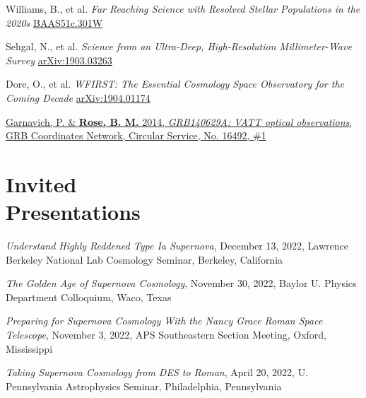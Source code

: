 \documentclass[margin]{res}
\begin{document}
\begin{resume}
\vspace{-12pt}\hspace{15pt}\hangindent=30pt 
Williams, B., et al. \textit{Far Reaching Science with Resolved Stellar Populations in the 2020s}
\href{https://ui.adsabs.harvard.edu/abs/2019BAAS...51c.301W/abstract}{BAAS51c.301W}

\vspace{-12pt}\hspace{15pt}\hangindent=30pt 
Sehgal, N., et al. \textit{Science from an Ultra-Deep, High-Resolution Millimeter-Wave Survey}
\href{https://ui.adsabs.harvard.edu/abs/2019arXiv190303263S/abstract}{arXiv:1903.03263}

\vspace{-12pt}\hspace{15pt}\hangindent=30pt 
Dore, O., et al. \textit{WFIRST: The Essential Cosmology Space Observatory for the Coming Decade}
\href{https://ui.adsabs.harvard.edu/abs/2019arXiv190401174D/abstract}{arXiv:1904.01174}

\vspace{-12pt}
\hangindent=15pt \href{https://ui.adsabs.harvard.edu/abs/2014GCN..16492...1G/abstract}{Garnavich, P. \& {\bf Rose, B. M.} 2014, {\sl GRB140629A: VATT optical observations}, GRB Coordinates Network, Circular Service, No. 16492, \#1}




\section{Invited \\Presentations}

\hangindent=15pt 
\textit{Understand Highly Reddened Type Ia Supernova}, December 13, 2022, Lawrence Berkeley National Lab Cosmology Seminar, Berkeley, California
\vspace{-12pt}

\hangindent=15pt 
\textit{The Golden Age of Supernova Cosmology}, November 30, 2022,  Baylor U. Physics Department Colloquium, Waco, Texas
\vspace{-12pt}


\hangindent=15pt 
\textit{Preparing for Supernova Cosmology With the Nancy Grace Roman Space Telescope}, November 3, 2022, APS Southeastern Section Meeting, Oxford, Mississippi
\vspace{-12pt}

\hangindent=15pt 
\textit{Taking Supernova Cosmology from DES to Roman}, April 20, 2022, U. Pennsylvania Astrophysics Seminar, Philadelphia, Pennsylvania
\vspace{-12pt}


\end{resume}
\end{document}
